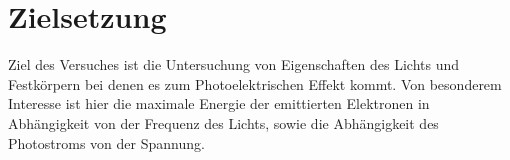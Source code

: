 \section{Zielsetzung}

Ziel des Versuches ist die Untersuchung von Eigenschaften des Lichts und Festkörpern bei denen es zum Photoelektrischen Effekt kommt. Von besonderem Interesse ist hier die
maximale Energie der emittierten Elektronen in Abhängigkeit von der Frequenz des Lichts, sowie die Abhängigkeit des Photostroms von der Spannung.


